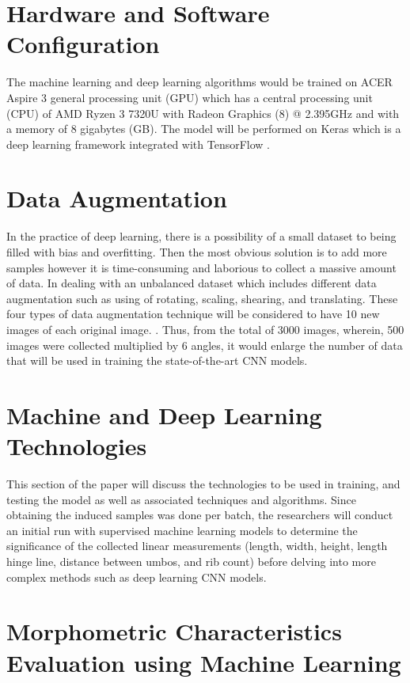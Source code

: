 \section{Hardware and Software Configuration}
The machine learning and deep learning algorithms would be trained on ACER Aspire 3 general processing unit (GPU) which has a central processing unit (CPU) of  AMD Ryzen 3 7320U with Radeon Graphics (8) @ 2.395GHz and with a memory of 8 gigabytes (GB). The model will be performed on Keras which is a deep learning framework integrated with TensorFlow \cite{cui2020}.

\section{Data Augmentation}
In the practice of deep learning, there is a possibility of a small dataset to being filled with bias and overfitting. Then the most obvious solution is to add more samples however it is time-consuming and laborious to collect a massive amount of data. In dealing with an unbalanced dataset which includes different data augmentation such as using of rotating, scaling, shearing, and translating. These four types of data augmentation technique will be considered to have 10 new images of each original image. \cite{cui2020}. Thus, from the total of 3000 images, wherein, 500 images were collected multiplied by 6 angles, it would enlarge the number of data that will be used in training the state-of-the-art CNN models. 

\section{Machine and Deep Learning Technologies}

This section of the paper will discuss the technologies to be used in training, and testing the model as well as associated techniques and algorithms.  Since obtaining the induced samples was done per batch, the researchers will conduct an initial run with supervised machine learning models to determine the significance of the collected linear measurements (length, width, height, length hinge line, distance between umbos, and rib count) before delving into more complex methods such as deep learning CNN models. 

\section{Morphometric Characteristics Evaluation using Machine Learning }
\label{sec:ml models}

